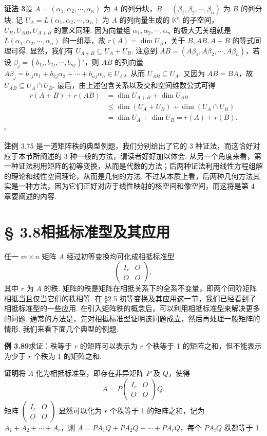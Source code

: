 \documentclass[UTF8, 12pt, fontset=fandol, oneside]{ctexart}
\begin{document}
\noindent\textbf{证法 3}\quad 设 $A=(\alpha_1,\alpha_2,\cdots,\alpha_n)$ 为 $A$ 的列分块，$B=(\beta_1,\beta_2,\cdots,\beta_n)$ 为 $B$ 的列分块. 记 $U_A=L(\alpha_1,\alpha_2,\cdots,\alpha_n)$ 为 $A$ 的列向量生成的 $\mathbb{K}^n$ 的子空间，$U_B,U_{AB},U_{A+B}$ 的意义同理. 因为向量组 $\alpha_1,\alpha_2,\cdots,\alpha_n$ 的极大无关组就是 $L(\alpha_1,\alpha_2,\cdots,\alpha_n)$ 的一组基，故 $r(A)=\dim U_A$，关于 $B,AB,A+B$ 的等式同理可得. 显然，我们有 $U_{A+B}\subseteq U_A+U_B$. 注意到 $AB=(A\beta_1,A\beta_2,\cdots,A\beta_n)$，若设 $\beta_j=(b_{1j},b_{2j},\cdots,b_{nj})'$，则 $AB$ 的列向量 $A\beta_j=b_{1j}\alpha_1+b_{2j}\alpha_2+\cdots+b_{nj}\alpha_n\in U_A$，从而 $U_{AB}\subseteq U_A$. 又因为 $AB=BA$，故 $U_{AB}\subseteq U_A\cap U_B$. 最后，由上述包含关系以及交和空间维数公式可得
\[
\begin{aligned}
r(A+B)+r(AB)&=\dim U_{A+B}+\dim U_{AB}\\
&\le \dim(U_A+U_B)+\dim(U_A\cap U_B)\\
&=\dim U_A+\dim U_B=r(A)+r(B).
\end{aligned}
\]
$\square$

\noindent\textbf{注}\quad 例 3.75 是一道矩阵秩的典型例题，我们分别给出了它的 3 种证法，而这恰好对应于本节所阐述的 3 种一般的方法，请读者好好加以体会. 从另一个角度来看，第一种证法利用矩阵的初等变换，从而是代数的方法；后两种证法利用线性方程组解的理论和线性空间理论，从而是几何的方法. 不过从本质上看，后两种几何方法其实是一种方法，因为它们正好对应于线性映射的核空间和像空间，而这将是第 4 章要阐述的内容.

\section*{§ 3.8\quad 相抵标准型及其应用}

任一 $m\times n$ 矩阵 $A$ 经过初等变换均可化成相抵标准型
\[
\begin{pmatrix}I_r&O\\O&O\end{pmatrix},
\]
其中 $r$ 为 $A$ 的秩. 矩阵的秩是矩阵在相抵关系下的全系不变量，即两个同阶矩阵相抵当且仅当它们的秩相等. 在 §2.5 初等变换及其应用这一节，我们已经看到了相抵标准型的一些应用. 在引入矩阵秩的概念后，可以利用相抵标准型来解决更多的问题. 通常的方法是，先对相抵标准型证明该问题成立，然后再处理一般矩阵的情形. 我们来看下面几个典型的例题.

\noindent\textbf{例 3.89}\quad 求证：秩等于 $r$ 的矩阵可以表示为 $r$ 个秩等于 1 的矩阵之和，但不能表示为少于 $r$ 个秩为 1 的矩阵之和.

\noindent\textbf{证明}\quad 将 $A$ 化为相抵标准型，即存在非异矩阵 $P$ 及 $Q$，使得
\[
A=P\begin{pmatrix}I_r&O\\O&O\end{pmatrix}Q.
\]
矩阵 $\begin{pmatrix}I_r&O\\O&O\end{pmatrix}$ 显然可以化为 $r$ 个秩等于 1 的矩阵之和，记为 $A_1+A_2+\cdots+A_r$，则 $A=PA_1Q+PA_2Q+\cdots+PA_rQ$，每个 $PA_iQ$ 秩都等于 1.
\end{document}
